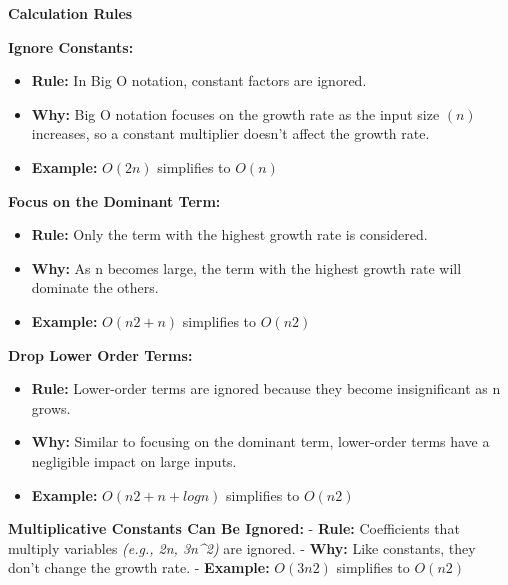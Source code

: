 \documentclass[
  letterpaper,
  DIV=11,
  numbers=noendperiod]{scrreprt}
\providecommand{\tightlist}{%
  \setlength{\itemsep}{0pt}\setlength{\parskip}{0pt}}
\begin{document}
\begin{tcolorbox}[enhanced jigsaw, colframe=quarto-callout-note-color-frame, toprule=.15mm, bottomrule=.15mm, rightrule=.15mm, colback=white, breakable, arc=.35mm, opacityback=0, left=2mm, leftrule=.75mm]

\vspace{-3mm}\textbf{Calculation Rules}\vspace{3mm}

\textbf{Ignore Constants:}

\begin{itemize}
\tightlist
\item
  \textbf{Rule:} In Big O notation, constant factors are ignored.
\item
  \textbf{Why:} Big O notation focuses on the growth rate as the input
  size \((n)\) increases, so a constant multiplier doesn't affect the
  growth rate.
\item
  \textbf{Example:} \(O(2n)\) simplifies to \(O(n)\)
\end{itemize}

\textbf{Focus on the Dominant Term:}

\begin{itemize}
\tightlist
\item
  \textbf{Rule:} Only the term with the highest growth rate is
  considered.
\item
  \textbf{Why:} As n becomes large, the term with the highest growth
  rate will dominate the others.
\item
  \textbf{Example:} \(O(n2+n)\) simplifies to \(O(n2)\)
\end{itemize}

\textbf{Drop Lower Order Terms:}

\begin{itemize}
\tightlist
\item
  \textbf{Rule:} Lower-order terms are ignored because they become
  insignificant as n grows.
\item
  \textbf{Why:} Similar to focusing on the dominant term, lower-order
  terms have a negligible impact on large inputs.
\item
  \textbf{Example:} \(O(n2 + n + log n)\) simplifies to \(O(n2)\)
\end{itemize}

\textbf{Multiplicative Constants Can Be Ignored:} - \textbf{Rule:}
Coefficients that multiply variables \emph{(e.g., 2n, 3n\^{}2)} are
ignored. - \textbf{Why:} Like constants, they don't change the growth
rate. - \textbf{Example:} \(O(3n2)\) simplifies to \(O(n2)\)


\end{tcolorbox}
\end{document}
